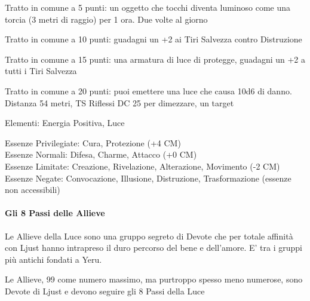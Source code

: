 \documentclass[a4paper,11pt,twoside,openany]{book}
\begin{document}
\bigskip

Tratto in comune a 5 punti: un oggetto che tocchi diventa luminoso come una torcia (3 metri di raggio) per 1 ora. Due volte al giorno

Tratto in comune a 10 punti: guadagni un +2 ai Tiri Salvezza contro Distruzione

Tratto in comune a 15 punti: una armatura di luce di protegge, guadagni un +2 a tutti i Tiri Salvezza

Tratto in comune a 20 punti: puoi emettere una luce che causa 10d6 di danno. Distanza 54 metri, TS Riflessi DC 25 per dimezzare, un target

\bigskip

Elementi: Energia Positiva, Luce

\bigskip

Essenze Privilegiate: Cura, Protezione (+4 CM)\\
Essenze Normali: Difesa, Charme, Attacco (+0 CM)\\
Essenze Limitate: Creazione, Rivelazione, Alterazione, Movimento (-2 CM)
Essenze Negate: Convocazione, Illusione, Distruzione, Trasformazione (essenze non accessibili)

\paragraph{Gli 8 Passi delle Allieve}

\label{gli-8-passi-delle-allieve}

Le Allieve della Luce sono una gruppo segreto di Devote che per totale affinità con Ljust hanno intrapreso il duro percorso del bene e dell'amore. E' tra i gruppi più antichi fondati a Yeru.

Le Allieve, 99 come numero massimo, ma purtroppo spesso meno numerose, sono Devote di Ljust e devono seguire gli 8 Passi della Luce
\end{document}
